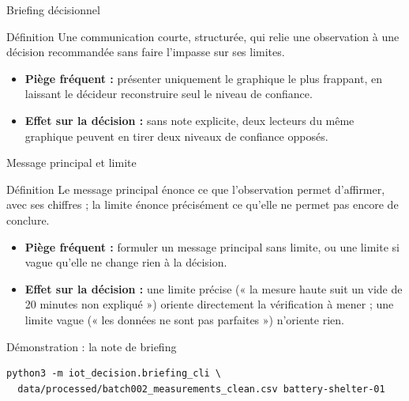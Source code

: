 \documentclass[aspectratio=169]{beamer}
\begin{document}
\begin{frame}{Briefing décisionnel}
  \begin{block}{Définition}
    Une communication courte, structurée, qui relie une observation à une décision recommandée sans faire l'impasse sur ses limites.
  \end{block}
  \begin{itemize}
    \item \textbf{Piège fréquent :} présenter uniquement le graphique le plus frappant, en laissant le décideur reconstruire seul le niveau de confiance.
    \item \textbf{Effet sur la décision :} sans note explicite, deux lecteurs du même graphique peuvent en tirer deux niveaux de confiance opposés.
  \end{itemize}
\end{frame}

\begin{frame}{Message principal et limite}
  \begin{block}{Définition}
    Le message principal énonce ce que l'observation permet d'affirmer, avec ses chiffres ; la limite énonce précisément ce qu'elle ne permet pas encore de conclure.
  \end{block}
  \begin{itemize}
    \item \textbf{Piège fréquent :} formuler un message principal sans limite, ou une limite si vague qu'elle ne change rien à la décision.
    \item \textbf{Effet sur la décision :} une limite précise (« la mesure haute suit un vide de 20 minutes non expliqué ») oriente directement la vérification à mener ; une limite vague (« les données ne sont pas parfaites ») n'oriente rien.
  \end{itemize}
\end{frame}

\begin{frame}[fragile]{Démonstration : la note de briefing}
  \scriptsize
  \begin{verbatim}
python3 -m iot_decision.briefing_cli \
  data/processed/batch002_measurements_clean.csv battery-shelter-01
  \end{verbatim}
  \normalsize
\end{frame}
\end{document}
